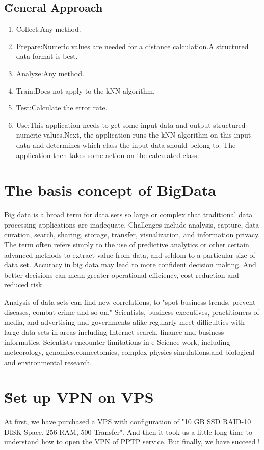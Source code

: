 \documentclass[12pt]{article}
\begin{document}
\subsection{\H General Approach}
\begin{enumerate}
	\item Collect:Any method.
	\item Prepare:Numeric values are needed for a distance calculation.A structured data format is best.
	\item Analyze:Any method.
	\item Train:Does not apply to the kNN algorithm.
	\item Test:Calculate the error rate.
	\item Use:This application needs to get some input data and output structured numeric values.Next, the application runs the kNN algorithm on this input data and determines which class the input data should belong to. The application then takes some action on the calculated class.
\end{enumerate}

\section{\H The basis concept of BigData}
Big data is a broad term for data sets so large or complex that traditional data processing applications are inadequate. Challenges include analysis, capture, data curation, search, sharing, storage, transfer, visualization, and information privacy. The term often refers simply to the use of predictive analytics or other certain advanced methods to extract value from data, and seldom to a particular size of data set. Accuracy in big data may lead to more confident decision making. And better decisions can mean greater operational efficiency, cost reduction and reduced risk.

Analysis of data sets can find new correlations, to "spot business trends, prevent diseases, combat crime and so on." Scientists, business executives, practitioners of media, and advertising and governments alike regularly meet difficulties with large data sets in areas including Internet search, finance and business informatics. Scientists encounter limitations in e-Science work, including meteorology, genomics,connectomics, complex physics simulations,and biological and environmental research.
\cite{wiki:xxx}

\section{\H Set up VPN on VPS}
At first, we have purchased a VPS with configuration of "10 GB SSD RAID-10 DISK Space, 256 RAM, 500 Transfer". And then it took us a little long time to understand how to open the VPN of PPTP service. But finally, we have succeed !
\end{document}
